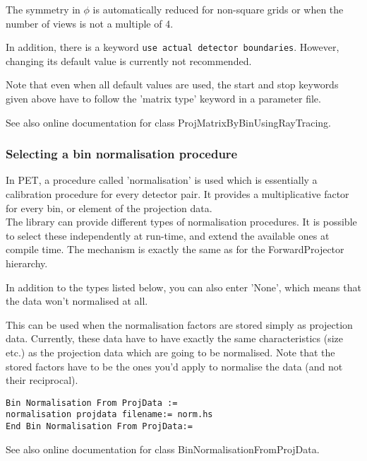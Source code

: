 \documentclass{article}
\begin{document}
The symmetry in $\phi$ is automatically reduced for non-square grids 
or when the number of views is not a multiple of 4.



In addition, there is a keyword \texttt{use actual detector boundaries}. 
However, changing its default value is currently not recommended. 




Note that even when all default values are used, the start and 
stop keywords given above have to follow the 'matrix type' keyword 
in a parameter file.


See also online documentation for class ProjMatrixByBinUsingRayTracing. 



\subsubsection{
Selecting a bin normalisation procedure}
\label{sec:binnormalisation}
In PET, a procedure called 'normalisation' is used which is essentially 
a calibration procedure for every detector pair. It provides 
a multiplicative factor for every bin, or element of the projection 
data.\\
The library can provide different types of normalisation procedures. 
It is possible to select these independently at run-time, and 
extend the available ones at compile time. The mechanism is exactly 
the same as for the ForwardProjector hierarchy.


In addition to the types listed below, you can also enter 'None', 
which means that the data won't normalised at all.

{ 
}

This can be used when the normalisation factors are stored simply 
as projection data. Currently, these data have to have exactly 
the same characteristics (size etc.) as the projection data which 
are going to be normalised. Note that the stored factors have 
to be the ones you'd apply to normalise the data (and not their 
reciprocal).

{ 
}
\begin{verbatim}
Bin Normalisation From ProjData :=
normalisation projdata filename:= norm.hs
End Bin Normalisation From ProjData:=
\end{verbatim}

See also online documentation for class BinNormalisationFromProjData.
\end{document}
